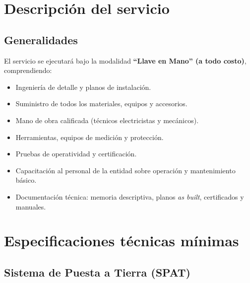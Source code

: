 \documentclass[12pt,a4paper]{article}
\begin{document}
\section{Descripción del servicio}

\subsection{Generalidades}

El servicio se ejecutará bajo la modalidad \textbf{``Llave en Mano'' (a todo costo)}, comprendiendo:
\begin{itemize}
  \item Ingeniería de detalle y planos de instalación.
  \item Suministro de todos los materiales, equipos y accesorios.
  \item Mano de obra calificada (técnicos electricistas y mecánicos).
  \item Herramientas, equipos de medición y protección.
  \item Pruebas de operatividad y certificación.
  \item Capacitación al personal de la entidad sobre operación y mantenimiento básico.
  \item Documentación técnica: memoria descriptiva, planos \emph{as built}, certificados y manuales.
\end{itemize}

\section{Especificaciones técnicas mínimas}

\subsection{Sistema de Puesta a Tierra (SPAT)}
\end{document}
